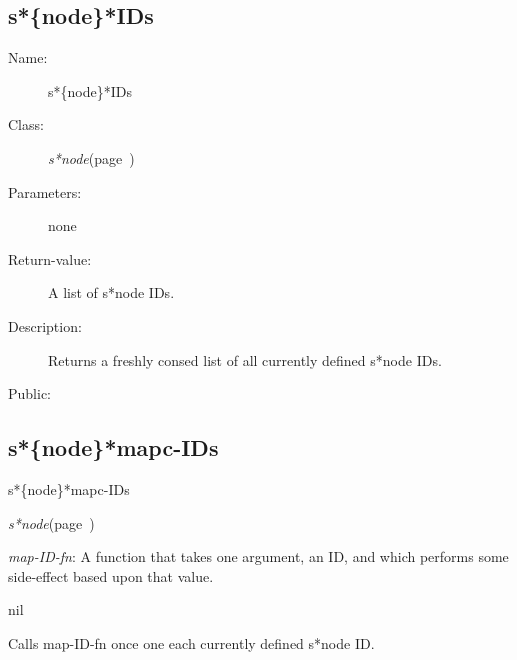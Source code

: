 \subsection{s*\{node\}*IDs}
\label{s*node*IDs}

\begin{description}
\item [Name:]  s*\{node\}*IDs

\item [Class:] {\sl s*node}\hfill(page~\pageref{s*node})

\item [Parameters:] none

\item [Return-value:]

A list of s*node IDs.

\item [Description:]

Returns a freshly consed list of all currently
defined s*node IDs.


\item [Public:]



\end{description}
\horizontalline

\subsection{s*\{node\}*mapc-IDs}
\label{s*node*mapc-IDs}

\begin{description}
\item [Name:]  s*\{node\}*mapc-IDs

\item [Class:] {\sl s*node}\hfill(page~\pageref{s*node})

\item [Parameters:]
\item {\sl map-ID-fn}:  A function that takes one argument, an ID,
and which performs some side-effect based upon that
value.

 

\item [Return-value:] nil

\item [Description:]

Calls map-ID-fn once one each currently defined
s*node ID.

\item [Public:]



\end{description}
\horizontalline

